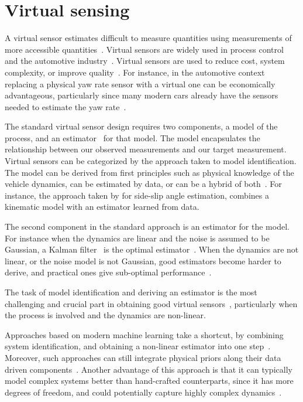 \documentclass[../main.tex]{subfiles}
\begin{document}
\section{Virtual sensing}

A virtual sensor estimates difficult to measure quantities using measurements of more accessible quantities~\citep{li2011review}. Virtual sensors are widely used in process control~\citep{fortuna2007soft, kadlec2009data} and the automotive industry~\citep{gustafsson2001virtual, shraim2006sliding, doumiati2009virtual}. Virtual sensors are used to reduce cost, system complexity, or improve quality~\citep{rockl2008integration}. For instance, in the automotive context replacing a physical yaw rate sensor with a virtual one can be economically advantageous, particularly since many modern cars already have the sensors needed to estimate the yaw rate~\citep{canale2008study}.

The standard virtual sensor design requires two components, a model of the process, and an estimator~\citep{canale2008study} for that model. The model encapsulates the relationship between our observed measurements and  our target measurement. Virtual sensors can be categorized by the approach taken to model identification. The model can be derived from first principles such as physical knowledge of the vehicle dynamics, can be estimated by data, or can be a hybrid of both~\citep{li2011review}. For instance, the approach taken by \cite{graber2018hybrid} for side-slip angle estimation, combines a kinematic model with an estimator learned from data. 

The second component in the standard approach is an estimator for the model. For instance when the dynamics are linear and the noise is assumed to be Gaussian, a Kalman filter~\citep{zarchan2013fundamentals} is the optimal estimator~\citep{canale2008study}. When the dynamics are not linear, or the noise model is not Gaussian, good estimators become harder to derive, and practical ones give sub-optimal performance~\citep{milanese2006filter}. 

The task of model identification and deriving an estimator is the most challenging and crucial part in obtaining good virtual sensors~\citep{li2011review}, particularly when the process is involved and the dynamics are non-linear.  

Approaches based on modern machine learning take a shortcut, by combining system identification, and obtaining a non-linear estimator into one step~\citep{rastogi2017virtual}. Moreover, such approaches can still integrate physical priors along their data driven components~\citep{costa1999hybrid, graber2018hybrid}. Another advantage of this approach is that it can typically model complex systems better than hand-crafted counterparts, since it has more degrees of freedom, and could potentially capture highly complex dynamics~\cite{li2011review}. 
\end{document}
